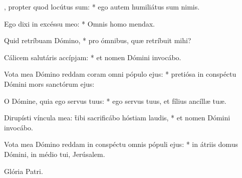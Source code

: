 \begin{psalmus}
    
    , propter quod locútus sum: * ego autem humiliátus sum nimis.
    
    Ego dixi in excéssu meo: * Omnis homo mendax.
    
    Quid retríbuam Dómino, * pro ómnibus, quæ retríbuit mihi?
    
    Cálicem salutáris accípjam: * et nomen Dómini invocábo.
    
    Vota mea Dómino reddam coram omni pópulo ejus: * pretiósa in conspéctu Dómini mors sanctórum ejus:
    
    O Dómine, quia ego servus tuus: * ego servus tuus, et fílius ancíllæ tuæ.
    
    Dirupísti víncula mea: \f tibi sacrificábo hóstiam laudis, * et nomen Dómini invocábo.
    
    Vota mea Dómino reddam in conspéctu omnis pópuli ejus: * in átriis domus Dómini, in médio tui, Jerúsalem.
    
		Glória Patri.

    \end{psalmus}
